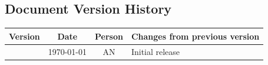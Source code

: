 %

\subsection*{Document Version History}

\begin{table}[h]
  \centering
  \begin{tabularx}{\textwidth}{|c|c|c|X|}
    \hline
    \rowcolor{iob-green}
             {\bf Version} & {\bf Date} & {\bf Person} & {\bf Changes from previous version} \\ \hline
              & \today & AN & Initial release \\ \hline
  \end{tabularx}
\end{table}
